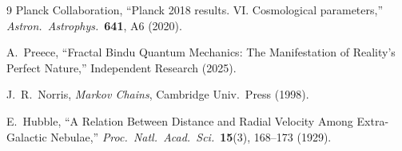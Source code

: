 \documentclass[%
  prd,
  twocolumn,
  10pt,
  nofootinbib,
  tightenlines,
  showkeys
]{revtex4-2}
\begin{document}

\begin{thebibliography}{9}
  Planck Collaboration, “Planck 2018 results. VI. Cosmological parameters,”
  \emph{Astron.\ Astrophys.}\ \textbf{641}, A6 (2020).

  A.~Preece, “Fractal Bindu Quantum Mechanics: The Manifestation of Reality’s Perfect Nature,”
  Independent Research (2025).

  J.~R.~Norris, \emph{Markov Chains}, Cambridge Univ.\ Press (1998).

  E.~Hubble, “A Relation Between Distance and Radial Velocity Among Extra-Galactic Nebulae,”
  \emph{Proc.\ Natl.\ Acad.\ Sci.}\ \textbf{15}(3), 168–173 (1929).
\end{thebibliography}
\end{document}
